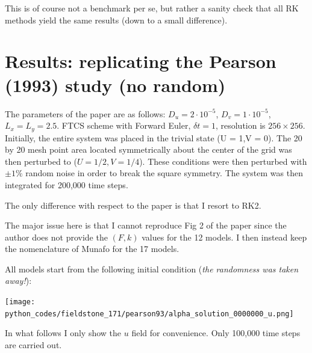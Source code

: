 This is of course not a benchmark per se, but rather a sanity check that 
all RK methods yield the same results (down to a small difference).


\newpage
\section*{Results: replicating the Pearson (1993) study (no random)}

The parameters of the paper are as follows: $D_u=2\cdot 10^{-5}$, $D_v=1\cdot 10^{-5}$,
$L_x=L_y=2.5$. FTCS scheme with Forward Euler, $\delta t=1$, 
resolution is $256 \times 256$.
Initially, the entire system was placed in
the trivial state (U = 1,V = 0). The 20 by 20 mesh point area located symmetrically
about the center of the grid was then
perturbed to ($U = 1/2,V = 1/4$). These
conditions were then perturbed with $\pm 1\%$
random noise in order to break the square
symmetry. The system was then integrated for 200,000 time steps.

The only difference with respect to the paper is that I resort to RK2.

The major issue here is that I cannot reproduce Fig 2 of the paper since the 
author does not provide the $(F,k)$ values for the 12 models. 
I then instead keep the nomenclature of Munafo for the 17 models.

All models start from the following initial condition ({\it the randomness was taken away!}):
\begin{center}
\texttt{[image: python\_codes/fieldstone\_171/pearson93/alpha\_solution\_0000000\_u.png]}
\end{center}

In what follows I only show the $u$ field for convenience.
Only 100,000 time steps are carried out.

